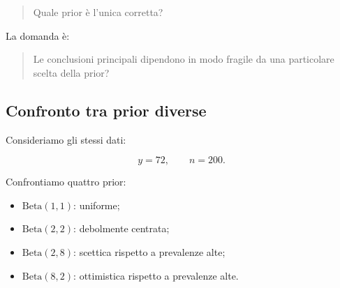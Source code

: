 \documentclass[
  italian,
  letterpaper,
  a4paper,
  11pt,
  open=any]{scrbook}
\providecommand{\tightlist}{%
  \setlength{\itemsep}{0pt}\setlength{\parskip}{0pt}}
\theoremstyle{plain}
\theoremstyle{definition}
\theoremstyle{definition}
\theoremstyle{remark}
\begin{document}
\begin{quote}
Quale prior è l'unica corretta?
\end{quote}

La domanda è:

\begin{quote}
Le conclusioni principali dipendono in modo fragile da una particolare
scelta della prior?
\end{quote}

\subsection{Confronto tra prior
diverse}\label{confronto-tra-prior-diverse}

Consideriamo gli stessi dati:

\[
y = 72, \qquad n = 200.
\]

Confrontiamo quattro prior:

\begin{itemize}
\tightlist
\item
  \(\text{Beta}(1,1)\): uniforme;
\item
  \(\text{Beta}(2,2)\): debolmente centrata;
\item
  \(\text{Beta}(2,8)\): scettica rispetto a prevalenze alte;
\item
  \(\text{Beta}(8,2)\): ottimistica rispetto a prevalenze alte.
\end{itemize}
\end{document}
